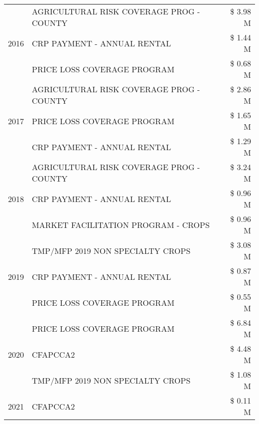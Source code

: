 \begin{tabular}{llr}
\cline{1-3}
\multirow[t]{3}{*}{2016} & AGRICULTURAL RISK COVERAGE PROG - COUNTY      & \$ 3.98 M \\
 & CRP PAYMENT - ANNUAL RENTAL                   & \$ 1.44 M \\
 & PRICE LOSS COVERAGE PROGRAM                   & \$ 0.68 M \\
\cline{1-3}
\multirow[t]{3}{*}{2017} & AGRICULTURAL RISK COVERAGE PROG - COUNTY & \$ 2.86 M \\
 & PRICE LOSS COVERAGE PROGRAM & \$ 1.65 M \\
 & CRP PAYMENT - ANNUAL RENTAL & \$ 1.29 M \\
\cline{1-3}
\multirow[t]{3}{*}{2018} & AGRICULTURAL RISK COVERAGE PROG - COUNTY & \$ 3.24 M \\
 & CRP PAYMENT - ANNUAL RENTAL & \$ 0.96 M \\
 & MARKET FACILITATION PROGRAM - CROPS & \$ 0.96 M \\
\cline{1-3}
\multirow[t]{3}{*}{2019} & TMP/MFP 2019 NON SPECIALTY CROPS & \$ 3.08 M \\
 & CRP PAYMENT - ANNUAL RENTAL & \$ 0.87 M \\
 & PRICE LOSS COVERAGE PROGRAM & \$ 0.55 M \\
\cline{1-3}
\multirow[t]{3}{*}{2020} & PRICE LOSS COVERAGE PROGRAM & \$ 6.84 M \\
 & CFAPCCA2 & \$ 4.48 M \\
 & TMP/MFP 2019 NON SPECIALTY CROPS & \$ 1.08 M \\
\cline{1-3}
2021 & CFAPCCA2 & \$ 0.11 M \\
\cline{1-3}
\bottomrule
\end{tabular}
